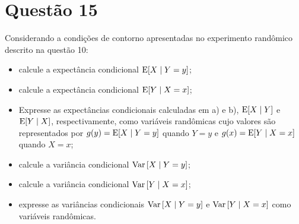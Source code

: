 \section{Questão 15}

Considerando a condições de contorno apresentadas no experimento randômico descrito na questão 10:

\begin{itemize}
    \item [a)] 
    calcule a expectância condicional $\mathrm{E}\!\left[X\mid Y = y\right]$;
    
    \item [b)] 
    calcule a expectância condicional $\mathrm{E}\!\left[Y\mid X = x\right]$;
    
    \item [c)]
    Expresse as expectâncias condicionais calculadas em a) e b), $\mathrm{E}\!\left[X\mid Y\right]$ e $\mathrm{E}\!\left[Y\mid X\right]$, respectivamente, como variáveis randômicas cujo valores são representados por 
    $g(y) = \mathrm{E}\!\left[X\mid Y = y\right]$ quando $Y = y$ e 
    $g(x) = \mathrm{E}\!\left[Y\mid X = x\right]$ quando $X = x$;
    
    \item [d)]
    calcule a variância condicional $\mathrm{Var}\left[X\mid Y=y\right]$;
    
    \item [e)]
    calcule a variância condicional $\mathrm{Var}\left[Y\mid X=x\right]$;
    
    \item [f)]
    expresse as variâncias condicionais $\mathrm{Var}\left[X\mid Y=y\right]$ e $\mathrm{Var}\left[Y\mid X=x\right]$ como variáveis randômicas.
\end{itemize}

